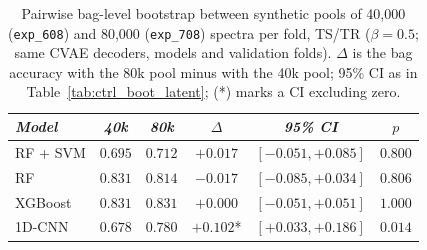 \begin{table}[H]
\centering
\scriptsize

\begin{tabular*}{\textwidth}{@{\extracolsep{\fill}}lccccc}
\toprule
\emph{Model} & \emph{40k} & \emph{80k} & \emph{$\Delta$} & \emph{95\% CI} & \emph{$p$} \\
\midrule
RF + SVM & $0.695$ & $0.712$ & $+0.017$ & $[-0.051, +0.085]$ & $0.800$ \\
RF & $0.831$ & $0.814$ & $-0.017$ & $[-0.085, +0.034]$ & $0.806$ \\
XGBoost & $0.831$ & $0.831$ & $+0.000$ & $[-0.051, +0.051]$ & $1.000$ \\
1D-CNN & $0.678$ & $0.780$ & $+0.102$* & $[+0.033, +0.186]$ & $0.014$ \\
\bottomrule
\end{tabular*}
\caption{\small Pairwise bag-level bootstrap between synthetic pools of 40,000 (\texttt{exp\_608}) and 80,000 (\texttt{exp\_708}) spectra per fold, TS/TR ($\beta=0.5$; same CVAE decoders, models and validation folds). $\Delta$ is the bag accuracy with the 80k pool minus with the 40k pool; 95\% CI as in Table~\ref{tab:ctrl_boot_latent}; (*) marks a CI excluding zero.}
\label{tab:ctrl_boot_pool}
\end{table}
